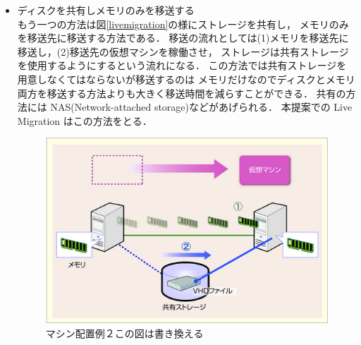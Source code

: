 \documentclass[graduation-thesis]{mlarticle}
\begin{document}
\begin{itemize}
\item ディスクを共有しメモリのみを移送する\\
      もう一つの方法は図\ref{livemigration}の様にストレージを共有し，
メモリのみを移送先に移送する方法である．
移送の流れとしては(1)メモリを移送先に移送し，(2)移送先の仮想マシンを稼働させ，
ストレージは共有ストレージを使用するようにするという流れになる．
この方法では共有ストレージを用意しなくてはならないが移送するのは
メモリだけなのでディスクとメモリ両方を移送する方法よりも大きく移送時間を減らすことができる．
共有の方法には NAS(Network-attached storage)などがあげられる．
本提案での Live Migration はこの方法をとる．
\begin{figure}[H]\begin{center}\includegraphics[width=16.0cm]{./img/arrangement2.png}\caption{ マシン配置例２この図は書き換える}\label{arrangement2}\end{center}\end{figure}
\end{itemize}
\end{document}

